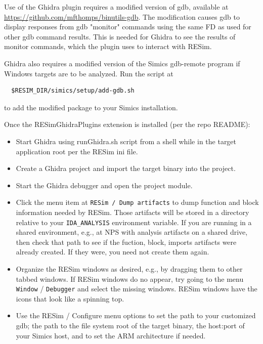 \documentclass[titlepage]{article}
\begin{document}
Use of the Ghidra plugin requires a modified version of gdb, available at
\url{https://github.com/mfthomps/binutils-gdb}.  The modification causes
gdb to display responses from gdb "monitor" commands using the same FD as used
for other gdb command results.  This is needed for Ghidra to see the results of monitor commands, which the plugin
uses to interact with RESim.

Ghidra also requires a modified version of the Simics gdb-remote program if Windows targets are to be
analyzed.  Run the script at
\begin{verbatim}
  $RESIM_DIR/simics/setup/add-gdb.sh
\end{verbatim}
to add the modified package to your Simics installation.

Once the RESimGhidraPlugins extension is installed (per the repo README): 
\begin{itemize}
\item Start Ghidra using runGhidra.sh script from a shell while in the target application root 
per the RESim ini file.

\item Create a Ghidra project and import the target binary into the project.

\item Start the Ghidra debugger and open the project module.

\item Click the menu item at {\tt RESim / Dump artifacts}  to dump function and block information
needed by RESim.  Those artifacts will be stored in a directory relative to your {\tt IDA\_ANALYSIS} environment variable.
If you are running in a shared environment, e.g., at NPS with analysis artifacts on a shared drive, then 
check that path to see if the fuction, block, imports artifacts were already created.  If they were, you need not create them again.

\item Organize the RESim windows
as desired, e.g., by dragging them to other tabbed windows.  If RESim windows do no appear, try going to the menu
{\tt Window} / {\tt Debugger} and select the missing windows.  RESim windows have the icons that look like a spinning top.

\item Use the RESim / Configure menu options to set the path to your customized gdb; the path to
the file system root of the target binary, the host:port of your Simics host, and to set the ARM architecture if needed.


\end{itemize}
\end{document}
